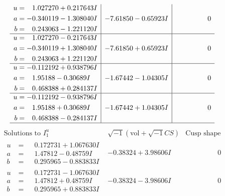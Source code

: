 \documentclass[1p]{elsarticle_modified}
\theoremstyle{definition}
\newcommand{\I}{\sqrt{-1}}
\begin{document}
$$\begin{array}{c|c|c}
\begin{aligned}
u &= \phantom{-}1.027270 + 0.217643 I \\
a &= -0.340119 - 1.308040 I \\
b &= \phantom{-}0.243063 - 1.221120 I\end{aligned}
 & -7.61850 - 0.65923 I & \phantom{-0.000000 } 0 \\ \hline\begin{aligned}
u &= \phantom{-}1.027270 - 0.217643 I \\
a &= -0.340119 + 1.308040 I \\
b &= \phantom{-}0.243063 + 1.221120 I\end{aligned}
 & -7.61850 + 0.65923 I & \phantom{-0.000000 } 0 \\ \hline\begin{aligned}
u &= -0.112192 + 0.938796 I \\
a &= \phantom{-}1.95188 - 0.30689 I \\
b &= \phantom{-}0.468388 + 0.284137 I\end{aligned}
 & -1.67442 - 1.04305 I & \phantom{-0.000000 } 0 \\ \hline\begin{aligned}
u &= -0.112192 - 0.938796 I \\
a &= \phantom{-}1.95188 + 0.30689 I \\
b &= \phantom{-}0.468388 - 0.284137 I\end{aligned}
 & -1.67442 + 1.04305 I & \phantom{-0.000000 } 0\\
 \hline 
 \end{array}$$\newpage$$\begin{array}{c|c|c}  
\text{Solutions to }I^u_{1}& \I (\text{vol} + \sqrt{-1}CS) & \text{Cusp shape}\\
 \hline 
\begin{aligned}
u &= \phantom{-}0.172731 + 1.067630 I \\
a &= \phantom{-}1.47812 - 0.48759 I \\
b &= \phantom{-}0.295965 - 0.883833 I\end{aligned}
 & -0.38324 + 3.98606 I & \phantom{-0.000000 } 0 \\ \hline\begin{aligned}
u &= \phantom{-}0.172731 - 1.067630 I \\
a &= \phantom{-}1.47812 + 0.48759 I \\
b &= \phantom{-}0.295965 + 0.883833 I\end{aligned}
 & -0.38324 - 3.98606 I & \phantom{-0.000000 } 0 \\ \hline\begin{aligned}

\end{aligned}
\end{array}$$
\end{document}
